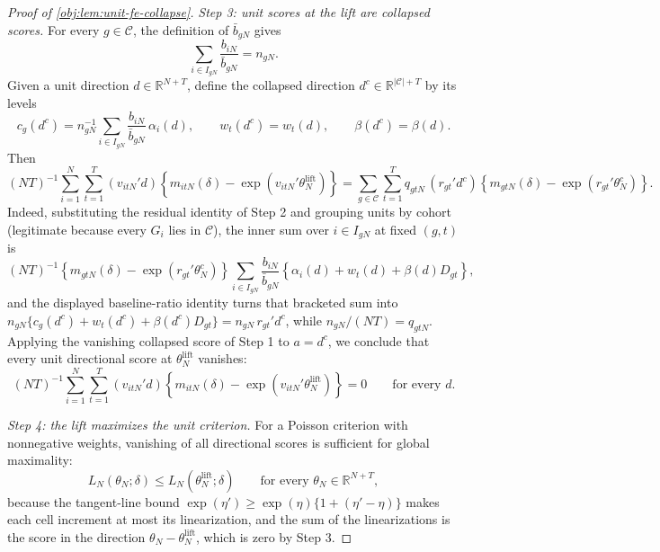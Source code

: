 \documentclass[11pt]{article}
\begin{document}
\begin{proof}[Proof of \cref{obj:lem:unit-fe-collapse}]
\textit{Step 3: unit scores at the lift are collapsed scores.} For every \(g\in\mathcal C\), the definition of \(\bar b_{gN}\) gives
\[
\sum_{i\in I_{gN}}\frac{b_{iN}}{\bar b_{gN}}=n_{gN}.
\]
Given a unit direction \(d\in\mathbb R^{N+T}\), define the collapsed direction \(d^{c}\in\mathbb R^{|\mathcal C|+T}\) by its levels
\[
c_g(d^{c})=n_{gN}^{-1}\sum_{i\in I_{gN}}\frac{b_{iN}}{\bar b_{gN}}\,\alpha_i(d),
\qquad
w_t(d^{c})=w_t(d),
\qquad
\beta(d^{c})=\beta(d).
\]
Then
\[
(NT)^{-1}\sum_{i=1}^N\sum_{t=1}^T
(v_{itN}'d)\left\{m_{itN}(\delta)-\exp(v_{itN}'\theta_N^{\text{lift}})\right\}
=
\sum_{g\in\mathcal C}\sum_{t=1}^T
q_{gtN}\,(r_{gt}'d^{c})\left\{m_{gtN}(\delta)-\exp(r_{gt}'\theta_N^c)\right\}.
\]
Indeed, substituting the residual identity of Step 2 and grouping units by cohort (legitimate because every \(G_i\) lies in \(\mathcal C\)), the inner sum over \(i\in I_{gN}\) at fixed \((g,t)\) is
\[
(NT)^{-1}\left\{m_{gtN}(\delta)-\exp(r_{gt}'\theta_N^c)\right\}
\sum_{i\in I_{gN}}\frac{b_{iN}}{\bar b_{gN}}
\left\{\alpha_i(d)+w_t(d)+\beta(d)D_{gt}\right\},
\]
and the displayed baseline-ratio identity turns that bracketed sum into \(n_{gN}\{c_g(d^{c})+w_t(d^{c})+\beta(d^{c})D_{gt}\}=n_{gN}\,r_{gt}'d^{c}\), while \(n_{gN}/(NT)=q_{gtN}\).
Applying the vanishing collapsed score of Step 1 to \(a=d^{c}\), we conclude that every unit directional score at \(\theta_N^{\text{lift}}\) vanishes:
\[
(NT)^{-1}\sum_{i=1}^N\sum_{t=1}^T
(v_{itN}'d)\left\{m_{itN}(\delta)-\exp(v_{itN}'\theta_N^{\text{lift}})\right\}=0
\qquad\text{for every }d .
\]

\textit{Step 4: the lift maximizes the unit criterion.} For a Poisson criterion with nonnegative weights, vanishing of all directional scores is sufficient for global maximality:
\[
L_N(\theta_N;\delta)\le L_N(\theta_N^{\text{lift}};\delta)
\qquad\text{for every }\theta_N\in\mathbb R^{N+T},
\]
because the tangent-line bound \(\exp(\eta')\ge\exp(\eta)\{1+(\eta'-\eta)\}\) makes each cell increment at most its linearization, and the sum of the linearizations is the score in the direction \(\theta_N-\theta_N^{\text{lift}}\), which is zero by Step 3.


\end{proof}
\end{document}
